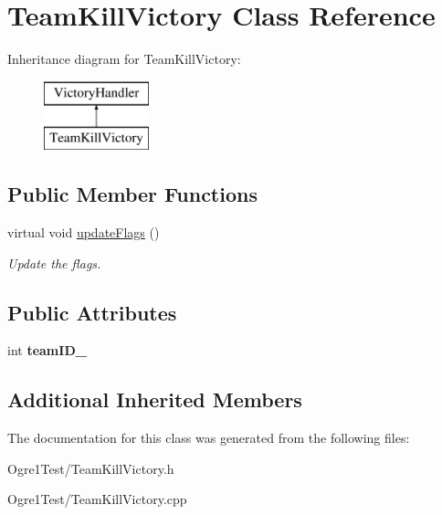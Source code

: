 \hypertarget{class_team_kill_victory}{}\section{Team\+Kill\+Victory Class Reference}
\label{class_team_kill_victory}
Inheritance diagram for Team\+Kill\+Victory\+:\begin{figure}[H]
\begin{center}
\leavevmode
\includegraphics[height=2.000000cm]{class_team_kill_victory}
\end{center}
\end{figure}
\subsection*{Public Member Functions}
\begin{DoxyCompactItemize}
\item 
virtual void \hyperlink{class_team_kill_victory_a3ab6f86407508e0740ceb9e9dafaad49}{update\+Flags} ()\hypertarget{class_team_kill_victory_a3ab6f86407508e0740ceb9e9dafaad49}{}\label{class_team_kill_victory_a3ab6f86407508e0740ceb9e9dafaad49}

\begin{DoxyCompactList}\small\item\em Update the flags. \end{DoxyCompactList}\end{DoxyCompactItemize}
\subsection*{Public Attributes}
\begin{DoxyCompactItemize}
\item 
int {\bfseries team\+I\+D\+\_\+}\hypertarget{class_team_kill_victory_afe6e532bbd9258658139f2724f6c660e}{}\label{class_team_kill_victory_afe6e532bbd9258658139f2724f6c660e}

\end{DoxyCompactItemize}
\subsection*{Additional Inherited Members}


The documentation for this class was generated from the following files\+:\begin{DoxyCompactItemize}
\item 
Ogre1\+Test/Team\+Kill\+Victory.\+h\item 
Ogre1\+Test/Team\+Kill\+Victory.\+cpp\end{DoxyCompactItemize}
